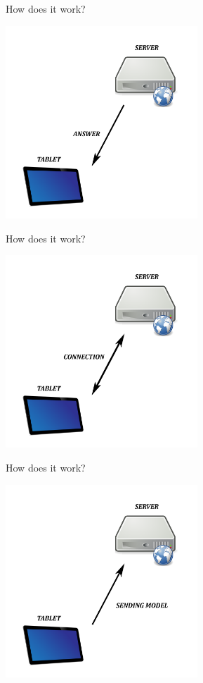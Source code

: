 \documentclass[a4paper,10pt]{beamer}
\begin{document}
			\begin{frame}{How does it work?}
				\centerline{\includegraphics[height=205pt]{images/network/answer.png}}
			\end{frame}
			
			\begin{frame}{How does it work?}
				\centerline{\includegraphics[height=205pt]{images/network/connection.png}}
			\end{frame}
			
			\begin{frame}{How does it work?}
				\centerline{\includegraphics[height=205pt]{images/network/sending_model.png}}
			\end{frame}
		
\end{document}
